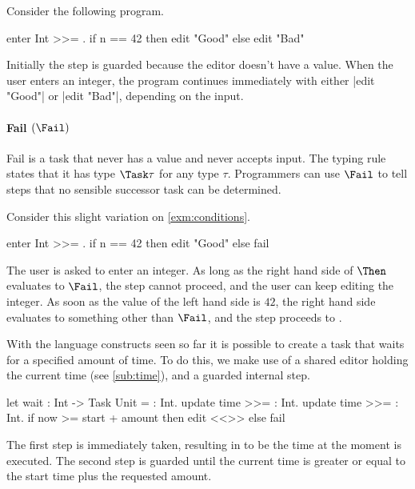 \begin{example}
\label{exm:conditions}

Consider the following program.
\begin{TASK}
  enter Int >>= \n. if n == 42 then edit "Good" else edit "Bad"
\end{TASK}
Initially the step is guarded because the editor doesn't have a value.
When the user enters an integer, the program continues immediately with either \TS|edit "Good"| or \TS|edit "Bad"|, depending on the input.

\end{example}




\paragraph{Fail $(\Fail)$}
\label{sub:fail}

Fail is a task that never has a value and never accepts input.
The typing rule  states that it has type $\Task \tau$ for any type $\tau$.
Programmers can use $\Fail$ to tell steps that no sensible successor task can be determined.

\begin{example}

Consider this slight variation on \cref{exm:conditions}.
\begin{TASK}
  enter Int >>= \n. if n == 42 then edit "Good" else fail
\end{TASK}
The user is asked to enter an integer.
As long as the right hand side of $\Then$ evaluates to $\Fail$, the step cannot proceed, and the user can keep editing the integer.
As soon as the value of the left hand side is $42$, the right hand side evaluates to something other than $\Fail$, and the step proceeds to .

\end{example}



\begin{example}[Waiting]\label{exm:wait}

With the language constructs seen so far it is possible to create a task that waits for a specified amount of time.
To do this,
we make use of a shared editor holding the current time (see \cref{sub:time}),
and a guarded internal step.
\begin{TASK}
  let wait : Int -> Task Unit = \amount : Int.
    update time >>= \start : Int.
    update time >>= \now : Int.
      if now >= start + amount then edit <<>> else fail
\end{TASK}
The first step is immediately taken, resulting in  to be the time at the moment  is executed.
The second step is guarded until the current time is greater or equal to the start time plus the requested amount.

\end{example}



